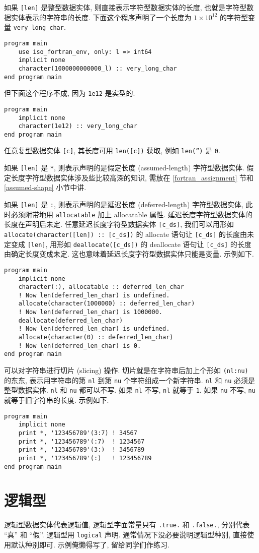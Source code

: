 如果 \texttt{[len]} 是整型数据实体, 则直接表示字符型数据实体的长度, 也就是字符型数据实体表示的字符串的长度. 下面这个程序声明了一个长度为 $1\times 10^{12}$ 的字符型变量 \texttt{very\_{}long\_{}char}.
\begin{lstlisting}
program main
    use iso_fortran_env, only: l => int64
    implicit none
    character(1000000000000_l) :: very_long_char
end program main
\end{lstlisting}
但下面这个程序不成, 因为 \texttt{1e12} 是实型的.
\begin{lstlisting}
program main
    implicit none
    character(1e12) :: very_long_char
end program main
\end{lstlisting}
任意复型数据实体 \texttt{[c]}, 其长度可用 \texttt{len([c])} 获取, 例如 \texttt{len('')} 是 \texttt{0}.

如果 \texttt{[len]} 是 \texttt{*}, 则表示声明的是假定长度 (assumed-length) 字符型数据实体. 假定长度字符型数据实体涉及些比较高深的知识, 需放在 \ref{fortran_assignment} 节和 \ref{assumed-shape} 小节中讲.

如果 \texttt{[len]} 是 \texttt{:}, 则表示声明的是延迟长度 (deferred-length) 字符型数据实体, 此时必须附带地用 \texttt{allocatable} 加上 allocatable 属性. 延迟长度字符型数据实体的长度在声明后未定. 任意延迟长度字符型数据实体 \texttt{[c\_{}ds]}, 我们可以用形如 \texttt{allocate(character([len]) :: [c\_{}ds])} 的 allocate 语句让 \texttt{[c\_{}ds]} 的长度由未定变成 \texttt{[len]}, 用形如 \texttt{deallocate([c\_{}ds])} 的 deallocate 语句让 \texttt{[c\_{}ds]} 的长度由确定长度变成未定. 这也意味着延迟长度字符型数据实体只能是变量. 示例如下.
\begin{lstlisting}
program main
    implicit none
    character(:), allocatable :: deferred_len_char
    ! Now len(deferred_len_char) is undefined.
    allocate(character(1000000) :: deferred_len_char)
    ! Now len(deferred_len_char) is 1000000.
    deallocate(deferred_len_char)
    ! Now len(deferred_len_char) is undefined.
    allocate(character(0) :: deferred_len_char)
    ! Now len(deferred_len_char) is 0.
end program main
\end{lstlisting}

可以对字符串进行切片 (slicing) 操作. 切片就是在字符串后加上个形如 \texttt{(nl:nu)} 的东东, 表示用字符串的第 \texttt{nl} 到第 \texttt{nu} 个字符组成一个新字符串. \texttt{nl} 和 \texttt{nu} 必须是整型数据实体. \texttt{nl} 和 \texttt{nu} 都可以不写. 如果 \texttt{nl} 不写, \texttt{nl} 就等于 \texttt{1}. 如果 \texttt{nu} 不写, \texttt{nu} 就等于旧字符串的长度. 示例如下.
\begin{lstlisting}
program main
    implicit none
    print *, '123456789'(3:7) ! 34567
    print *, '123456789'(:7)  ! 1234567
    print *, '123456789'(3:)  ! 3456789
    print *, '123456789'(:)   ! 123456789
end program main
\end{lstlisting}

\section{逻辑型}

逻辑型数据实体代表逻辑值, 逻辑型字面常量只有 \texttt{.true.} 和 \texttt{.false.}, 分别代表 ``真'' 和 ``假''. 逻辑型用 \texttt{logical} 声明. 通常情况下没必要说明逻辑型种别, 直接使用默认种别即可. 示例俺懒得写了, 留给同学们作练习.
